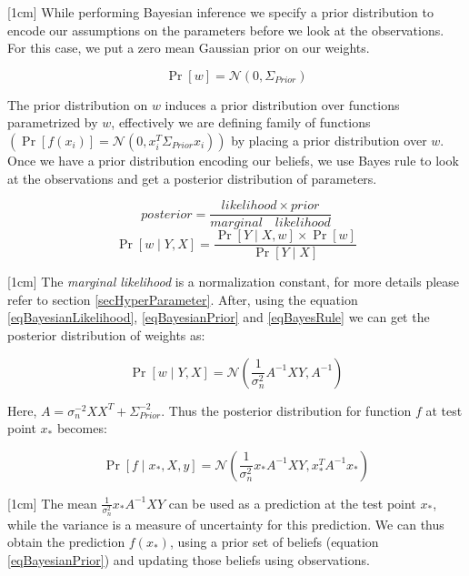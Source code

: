 [1cm]
While performing Bayesian inference we specify a prior distribution to encode our assumptions on the parameters before we look at the observations. For this case, we put a zero mean Gaussian prior on our weights.

\begin{equation}\label{eqBayesianPrior}
\Pr[w] = \mathcal{N}(0, \Sigma_{Prior})
\end{equation}

The prior distribution on $w$ induces a prior distribution over functions parametrized by $w$, effectively we are defining family of functions $(\Pr[f(x_{i})] = \mathcal{N}(0, x_{i}^{T}\Sigma_{Prior}x_{i}))$ by placing a prior distribution over $w$. Once we have a prior distribution encoding our beliefs, we use Bayes rule to look at the observations and get a posterior distribution of parameters.

\begin{equation*}
posterior = \frac{likelihood \times prior}{marginal \quad likelihood}
\end{equation*}
\begin{equation}\label{eqBayesRule}
\Pr[w \mid Y, X] = \frac{\Pr[Y \mid X, w] \times \Pr[w]}{\Pr[Y \mid X]}
\end{equation}

[1cm]
The \textsl{marginal likelihood} is a normalization constant, for more details please refer to section \ref{secHyperParameter}. After, using the equation \ref{eqBayesianLikelihood}, \ref{eqBayesianPrior} and \ref{eqBayesRule} we can get the posterior distribution of weights as:

\begin{equation}\label{eqBayesianPosterior}
\Pr[w \mid Y, X]  = \mathcal{N}\left ( \frac{1}{\sigma_{n}^{2}} A^{-1}X Y , A^{-1} \right )
\end{equation}

Here, $A = \sigma_{n}^{-2}XX^{T} + \Sigma_{Prior}^{-2}$. Thus the posterior distribution for function $f$ at test point $x_{*}$ becomes:

\begin{equation}\label{eqBayesianFunctionalPosterior}
\Pr[f \mid x_{*}, X, y]  = \mathcal{N}\left ( \frac{1}{\sigma_{n}^{2}} x_{*}A^{-1}XY , x_{*}^{T}A^{-1}x_{*} \right )
\end{equation}

[1cm]
The mean $\frac{1}{\sigma_{n}^{2}} x_{*}A^{-1}XY$ can be used as a prediction at the test point $x_{*}$, while the variance is a measure of uncertainty for this prediction. We can thus obtain the prediction $f(x_{*})$, using a prior set of beliefs (equation \ref{eqBayesianPrior}) and updating those beliefs using observations. 

